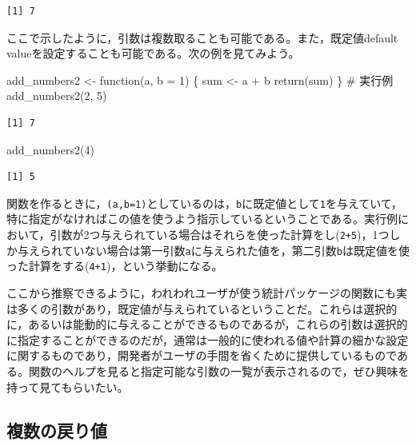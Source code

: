 \documentclass[
  a4paper,
]{ltjsbook}
\newenvironment{Shaded}{\begin{snugshade}}{\end{snugshade}}
\newcommand{\AttributeTok}[1]{\textcolor[rgb]{0.40,0.45,0.13}{#1}}
\newcommand{\CommentTok}[1]{\textcolor[rgb]{0.37,0.37,0.37}{#1}}
\newcommand{\ControlFlowTok}[1]{\textcolor[rgb]{0.00,0.23,0.31}{#1}}
\newcommand{\DecValTok}[1]{\textcolor[rgb]{0.68,0.00,0.00}{#1}}
\newcommand{\FunctionTok}[1]{\textcolor[rgb]{0.28,0.35,0.67}{#1}}
\newcommand{\NormalTok}[1]{\textcolor[rgb]{0.00,0.23,0.31}{#1}}
\newcommand{\OtherTok}[1]{\textcolor[rgb]{0.00,0.23,0.31}{#1}}
\newcommand{\SpecialCharTok}[1]{\textcolor[rgb]{0.37,0.37,0.37}{#1}}
\begin{document}
\begin{verbatim}
[1] 7
\end{verbatim}

ここで示したように，引数は複数取ることも可能である。また，既定値default
valueを設定することも可能である。次の例を見てみよう。

\begin{Shaded}
\begin{Highlighting}[]
\NormalTok{add\_numbers2 }\OtherTok{\textless{}{-}} \ControlFlowTok{function}\NormalTok{(a, }\AttributeTok{b =} \DecValTok{1}\NormalTok{) \{}
\NormalTok{  sum }\OtherTok{\textless{}{-}}\NormalTok{ a }\SpecialCharTok{+}\NormalTok{ b}
  \FunctionTok{return}\NormalTok{(sum)}
\NormalTok{\}}
\CommentTok{\# 実行例}
\FunctionTok{add\_numbers2}\NormalTok{(}\DecValTok{2}\NormalTok{, }\DecValTok{5}\NormalTok{)}
\end{Highlighting}
\end{Shaded}

\begin{verbatim}
[1] 7
\end{verbatim}

\begin{Shaded}
\begin{Highlighting}[]
\FunctionTok{add\_numbers2}\NormalTok{(}\DecValTok{4}\NormalTok{)}
\end{Highlighting}
\end{Shaded}

\begin{verbatim}
[1] 5
\end{verbatim}

関数を作るときに，\texttt{(a,b=1)}としているのは，\texttt{b}に既定値として\texttt{1}を与えていて，特に指定がなければこの値を使うよう指示しているということである。実行例において，引数が2つ与えられている場合はそれらを使った計算をし(\texttt{2+5})，1つしか与えられていない場合は第一引数\texttt{a}に与えられた値を，第二引数\texttt{b}は既定値を使った計算をする(\texttt{4+1})，という挙動になる。

ここから推察できるように，われわれユーザが使う統計パッケージの関数にも実は多くの引数があり，既定値が与えられているということだ。これらは選択的に，あるいは能動的に与えることができるものであるが，これらの引数は選択的に指定することができるのだが，通常は一般的に使われる値や計算の細かな設定に関するものであり，開発者がユーザの手間を省くために提供しているものである。関数のヘルプを見ると指定可能な引数の一覧が表示されるので，ぜひ興味を持って見てもらいたい。

\subsection{複数の戻り値}\label{ux8907ux6570ux306eux623bux308aux5024}
\end{document}
